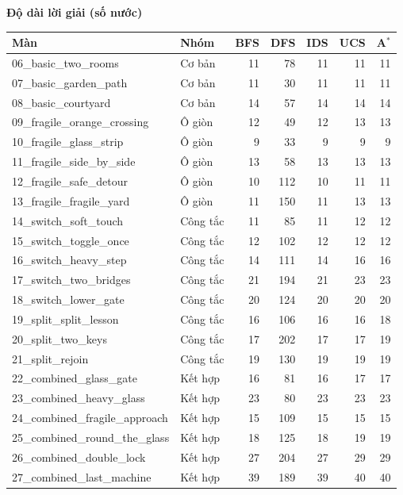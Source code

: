 \vspace{1.1em}

{\textbf{Độ dài lời giải (số nước)}}\\[0.4em]
\begin{tabular}{llrrrrr}
\hline
Màn & Nhóm & BFS & DFS & IDS & UCS & A$^*$ \\
\hline
06\_basic\_two\_rooms & Cơ bản & 11 & 78 & 11 & 11 & 11 \\
07\_basic\_garden\_path & Cơ bản & 11 & 30 & 11 & 11 & 11 \\
08\_basic\_courtyard & Cơ bản & 14 & 57 & 14 & 14 & 14 \\
09\_fragile\_orange\_crossing & Ô giòn & 12 & 49 & 12 & 13 & 13 \\
10\_fragile\_glass\_strip & Ô giòn & 9 & 33 & 9 & 9 & 9 \\
11\_fragile\_side\_by\_side & Ô giòn & 13 & 58 & 13 & 13 & 13 \\
12\_fragile\_safe\_detour & Ô giòn & 10 & 112 & 10 & 11 & 11 \\
13\_fragile\_fragile\_yard & Ô giòn & 11 & 150 & 11 & 13 & 13 \\
14\_switch\_soft\_touch & Công tắc & 11 & 85 & 11 & 12 & 12 \\
15\_switch\_toggle\_once & Công tắc & 12 & 102 & 12 & 12 & 12 \\
16\_switch\_heavy\_step & Công tắc & 14 & 111 & 14 & 16 & 16 \\
17\_switch\_two\_bridges & Công tắc & 21 & 194 & 21 & 23 & 23 \\
18\_switch\_lower\_gate & Công tắc & 20 & 124 & 20 & 20 & 20 \\
19\_split\_split\_lesson & Công tắc & 16 & 106 & 16 & 16 & 18 \\
20\_split\_two\_keys & Công tắc & 17 & 202 & 17 & 17 & 19 \\
21\_split\_rejoin & Công tắc & 19 & 130 & 19 & 19 & 19 \\
22\_combined\_glass\_gate & Kết hợp & 16 & 81 & 16 & 17 & 17 \\
23\_combined\_heavy\_glass & Kết hợp & 23 & 80 & 23 & 23 & 23 \\
24\_combined\_fragile\_approach & Kết hợp & 15 & 109 & 15 & 15 & 15 \\
25\_combined\_round\_the\_glass & Kết hợp & 18 & 125 & 18 & 19 & 19 \\
26\_combined\_double\_lock & Kết hợp & 27 & 204 & 27 & 29 & 29 \\
27\_combined\_last\_machine & Kết hợp & 39 & 189 & 39 & 40 & 40 \\
\hline
\end{tabular}


